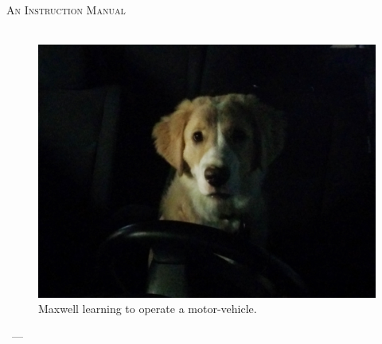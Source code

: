 \begin{titlepage}
    \begin{center}
        \ %
        \textsc{\huge \thetitle}\\
        \textsc{An Instruction Manual}\\[1em]
        \HRule \\[1em]

        \begin{figure}[h!]
            \centering
            \includegraphics[width=.75\textwidth]{./images/max/title.jpg}
            \caption{Maxwell learning to operate a motor-vehicle.}
            \label{fig:max_title}
        \end{figure}

        \vfill
        {
            \large \theauthor \  --- \large \thedate
        }

    \end{center}
\end{titlepage}
